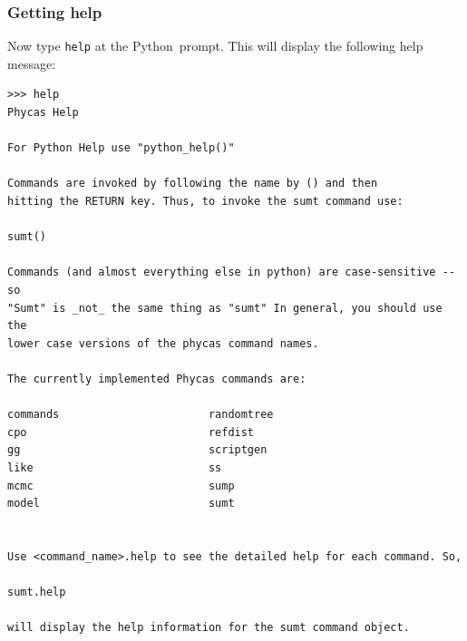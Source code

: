 \documentclass[10pt]{article}
\newcommand{\pathname}[1]{{\em #1}}				%
\newcommand{\code}[1]{{\tt #1}}					%
\newcommand{\cmd}[1]{{\tt \small #1}\index{#1}}	%
\newcommand{\term}[1]{#1\index{#1}}	%
\newcommand{\Windows}{Windows$^{\mbox{\tiny\textregistered}}$ }
\newcommand{\python}{{\sc Python}\index{Python}}
\newcommand{\phycas}{{\sc Phycas}\index{Phycas}}
\newcommand{\phycasapp}{\pathname{Phycas.app}}
\begin{document}



\subsubsection{Getting help} \label{subsubsection:gettinghelp}
Now type \cmd{help} at the \python\ prompt. This will display the following help message:
\begin{verbatim}
>>> help
Phycas Help

For Python Help use "python_help()"

Commands are invoked by following the name by () and then
hitting the RETURN key. Thus, to invoke the sumt command use:

sumt()

Commands (and almost everything else in python) are case-sensitive -- so
"Sumt" is _not_ the same thing as "sumt" In general, you should use the
lower case versions of the phycas command names.

The currently implemented Phycas commands are:

commands                       randomtree
cpo                            refdist
gg                             scriptgen
like                           ss
mcmc                           sump
model                          sumt


Use <command_name>.help to see the detailed help for each command. So,

sumt.help

will display the help information for the sumt command object.
\end{verbatim}
\end{document}

